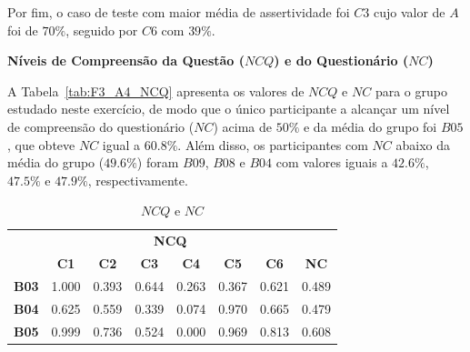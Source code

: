 Por fim, o caso de teste com maior média de assertividade foi $C3$ cujo valor de $A$ foi de $70\%$, seguido por $C6$ com $39\%$.

\textbf{Níveis de Compreensão da Questão ($NCQ$) e do Questionário ($NC$)}

A Tabela~\ref{tab:F3_A4_NCQ} apresenta os valores de $NCQ$ e $NC$ para o grupo estudado neste exercício, de modo que o único participante a alcançar um nível de compreensão do questionário ($NC$) acima de $50\%$ e da média do grupo foi $B05$, que obteve $NC$ igual a $60.8\%$. Além disso, os participantes com $NC$ abaixo da média do grupo ($49.6\%$) foram $B09$, $B08$ e $B04$ com valores iguais a $42.6\%$, $47.5\%$ e $47.9\%$, respectivamente.

\begin{table}[htbp]
	\centering
	\caption{$NCQ$ e $NC$}
	\begin{tabular}{|c|cccccc|c|}
		\hline
		\rowcolor[HTML]{D0CECE} 
		\cellcolor[HTML]{D0CECE} & \multicolumn{6}{c|}{\cellcolor[HTML]{D0CECE}\textbf{NCQ}} & \cellcolor[HTML]{D0CECE} \\ \cline{2-7}
		\rowcolor[HTML]{D0CECE} 
		\multirow{-2}{*}{\cellcolor[HTML]{D0CECE}\textbf{Participante}} & \multicolumn{1}{c|}{\cellcolor[HTML]{D0CECE}\textbf{C1}} & \multicolumn{1}{c|}{\cellcolor[HTML]{D0CECE}\textbf{C2}} & \multicolumn{1}{c|}{\cellcolor[HTML]{D0CECE}\textbf{C3}} & \multicolumn{1}{c|}{\cellcolor[HTML]{D0CECE}\textbf{C4}} & \multicolumn{1}{c|}{\cellcolor[HTML]{D0CECE}\textbf{C5}} & \textbf{C6} & \multirow{-2}{*}{\cellcolor[HTML]{D0CECE}\textbf{NC}} \\ \hline
		\rowcolor[HTML]{FFFFFF} 
		\textbf{B03} & \multicolumn{1}{c|}{\cellcolor[HTML]{FFFFFF}1.000} & \multicolumn{1}{c|}{\cellcolor[HTML]{FFFFFF}0.393} & \multicolumn{1}{c|}{\cellcolor[HTML]{FFFFFF}0.644} & \multicolumn{1}{c|}{\cellcolor[HTML]{FFFFFF}0.263} & \multicolumn{1}{c|}{\cellcolor[HTML]{FFFFFF}0.367} & 0.621 & 0.489 \\ \hline
		\rowcolor[HTML]{E7E6E6} 
		\textbf{B04} & \multicolumn{1}{c|}{\cellcolor[HTML]{E7E6E6}0.625} & \multicolumn{1}{c|}{\cellcolor[HTML]{E7E6E6}0.559} & \multicolumn{1}{c|}{\cellcolor[HTML]{E7E6E6}0.339} & \multicolumn{1}{c|}{\cellcolor[HTML]{E7E6E6}0.074} & \multicolumn{1}{c|}{\cellcolor[HTML]{E7E6E6}0.970} & 0.665 & 0.479 \\ \hline
		\rowcolor[HTML]{FFFFFF} 
		\textbf{B05} & \multicolumn{1}{c|}{\cellcolor[HTML]{FFFFFF}0.999} & \multicolumn{1}{c|}{\cellcolor[HTML]{FFFFFF}0.736} & \multicolumn{1}{c|}{\cellcolor[HTML]{FFFFFF}0.524} & \multicolumn{1}{c|}{\cellcolor[HTML]{FFFFFF}0.000} & \multicolumn{1}{c|}{\cellcolor[HTML]{FFFFFF}0.969} & 0.813 & 0.608 \\ \hline

\end{tabular}
\end{table}
